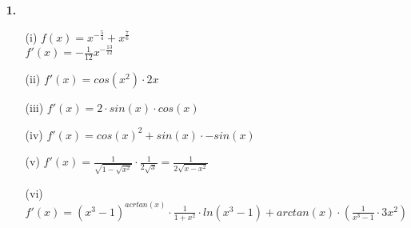 \documentclass[a4paper,11pt]{scrartcl}
\author{\authorinfo}
\title{\titleinfo}
\date{\today}
\begin{document}
\maketitle
\begin{enumerate}
    \item[\textbf{1.}]
        \begin{enumerate}
            \item[(i)]
                \(f(x) = x^{-\frac{5}{4}} + x^\frac{7}{6}\) \\
                \(f'(x)= -\frac{1}{12}x^{-\frac{13}{12}}\)
            \item[(ii)]
                \(f'(x)= cos(x^2) \cdot 2x\)
            \item[(iii)]
                \(f'(x)= 2 \cdot sin(x) \cdot cos(x)\)
            \item[(iv)]
                \(f'(x)= cos(x)^2 + sin(x) \cdot - sin(x)\)
            \item[(v)]  
                \(f'(x)= \frac{1}{\sqrt{1-\sqrt{x^2}}} \cdot \frac{1}{2 \sqrt{x}} = \frac{1}{2 \sqrt{x-x^2}}\)
            \item[(vi)]
                \(f'(x)= (x^3 - 1)^{acrtan(x)} \cdot \frac{1}{1+x^2} \cdot ln(x^3 - 1) + arctan(x) \cdot \left( \frac{1}{x^3-1} \cdot 3x^2 \right) \)
        \end{enumerate}


\end{enumerate}
\end{document}
